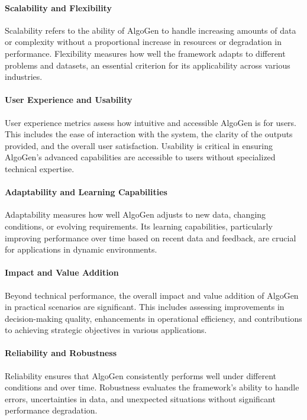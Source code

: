 \documentclass{article}
\begin{document}
\paragraph{Scalability and Flexibility}
Scalability refers to the ability of AlgoGen to handle increasing amounts of data or complexity without a proportional increase in resources or degradation in performance. Flexibility measures how well the framework adapts to different problems and datasets, an essential criterion for its applicability across various industries.

\paragraph{User Experience and Usability}
User experience metrics assess how intuitive and accessible AlgoGen is for users. This includes the ease of interaction with the system, the clarity of the outputs provided, and the overall user satisfaction. Usability is critical in ensuring AlgoGen's advanced capabilities are accessible to users without specialized technical expertise.

\paragraph{Adaptability and Learning Capabilities}
Adaptability measures how well AlgoGen adjusts to new data, changing conditions, or evolving requirements. Its learning capabilities, particularly improving performance over time based on recent data and feedback, are crucial for applications in dynamic environments.

\paragraph{Impact and Value Addition}
Beyond technical performance, the overall impact and value addition of AlgoGen in practical scenarios are significant. This includes assessing improvements in decision-making quality, enhancements in operational efficiency, and contributions to achieving strategic objectives in various applications.

\paragraph{Reliability and Robustness}
Reliability ensures that AlgoGen consistently performs well under different conditions and over time. Robustness evaluates the framework's ability to handle errors, uncertainties in data, and unexpected situations without significant performance degradation.
\end{document}
